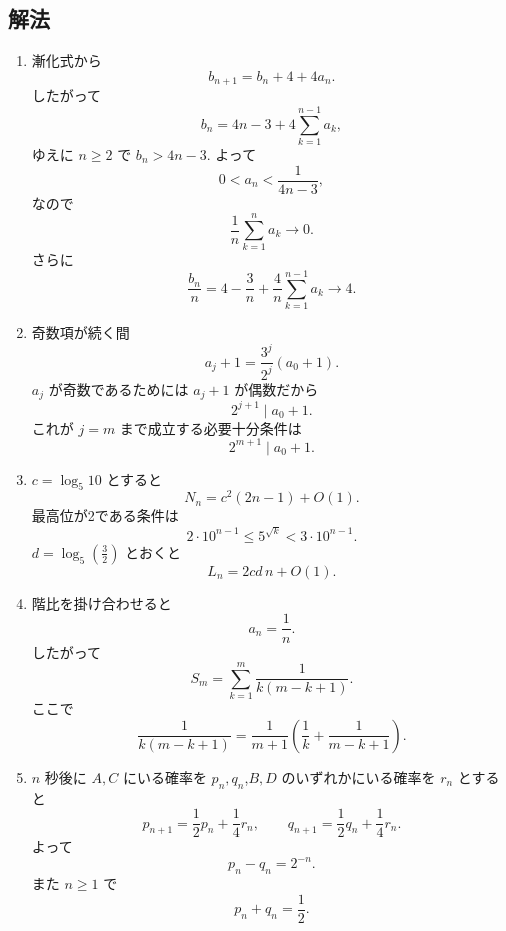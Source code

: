     \subsection{解法}\label{節：大学過去問ベースのもの：解法}
      \begin{enumerate}[label=\textbf{問\arabic*.},leftmargin=3.8em,format=\bookitemlink{practice-entrance}{solution}{problem}]
        \item 漸化式から
          \[
            b_{n+1}=b_n+4+4a_n.
          \]
              したがって
          \[
            b_n=4n-3+4\sum_{k=1}^{n-1}a_k,
          \]
              ゆえに \(n\ge2\) で \(b_n>4n-3\). よって
          \[
            0<a_n<\frac1{4n-3},
          \]
              なので
          \[
            \frac1n\sum_{k=1}^{n}a_k\to0.
          \]
              さらに
          \[
            \frac{b_n}{n}
            =4-\frac3n+\frac4n\sum_{k=1}^{n-1}a_k\to4.
          \]
        \item 奇数項が続く間
          \[
            a_j+1=\frac{3^j}{2^j}(a_0+1).
          \]
              \(a_j\) が奇数であるためには \(a_j+1\) が偶数だから
          \[
            2^{j+1}\mid a_0+1.
          \]
              これが \(j=m\) まで成立する必要十分条件は
          \[
            2^{m+1}\mid a_0+1.
          \]
        \item  \(c=\log_5 10\) とすると
          \[
            N_n=c^2(2n-1)+O(1).
          \]
              最高位が2である条件は
          \[
            2\cdot10^{n-1}\le5^{\sqrt{k}}<3\cdot10^{n-1}.
          \]
              \(d=\log_5(\displaystyle \frac{3}{2})\) とおくと
          \[
            L_n=2cd\,n+O(1).
          \]
        \item 階比を掛け合わせると
          \[
            a_n=\frac1n.
          \]
              したがって
          \[
            S_m=\sum_{k=1}^{m}\frac1{k(m-k+1)}.
          \]
              ここで
          \[
            \frac1{k(m-k+1)}
            =\frac1{m+1}\left(\frac1k+\frac1{m-k+1}\right).
          \]
        \item  \(n\) 秒後に \(A,C\) にいる確率を \(p_n,q_n\),\(B,D\) のいずれかにいる確率を \(r_n\) とすると
          \[
            p_{n+1}=\frac12p_n+\frac14r_n,\qquad
            q_{n+1}=\frac12q_n+\frac14r_n.
          \]
              よって
          \[
            p_n-q_n=2^{-n}.
          \]
              また \(n\ge1\) で
          \[
            p_n+q_n=\frac12.
          \]
      \end{enumerate}
